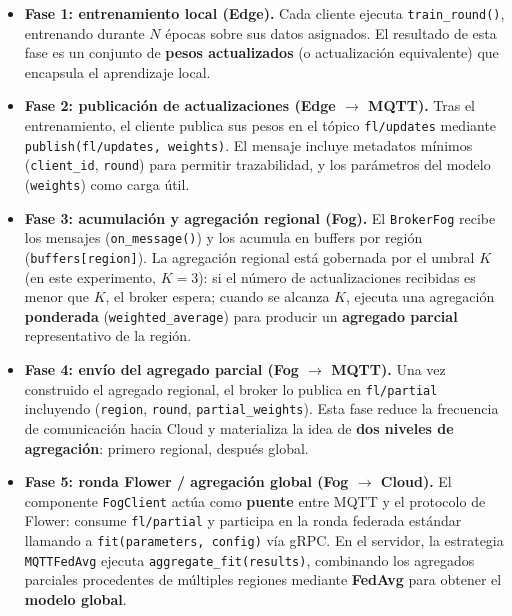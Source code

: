 \documentclass{report}
\begin{document}
\begin{itemize}\setlength\itemsep{0.25em}
    \item \textbf{Fase 1: entrenamiento local (Edge).} Cada cliente ejecuta \texttt{train\_round()}, entrenando durante $N$ épocas sobre sus datos asignados. El resultado de esta fase es un conjunto de \textbf{pesos actualizados} (o actualización equivalente) que encapsula el aprendizaje local.

    \item \textbf{Fase 2: publicación de actualizaciones (Edge $\rightarrow$ MQTT).} Tras el entrenamiento, el cliente publica sus pesos en el tópico \texttt{fl/updates} mediante \texttt{publish(fl/updates, weights)}. El mensaje incluye metadatos mínimos (\texttt{client\_id}, \texttt{round}) para permitir trazabilidad, y los parámetros del modelo (\texttt{weights}) como carga útil.

    \item \textbf{Fase 3: acumulación y agregación regional (Fog).} El \texttt{BrokerFog} recibe los mensajes (\texttt{on\_message()}) y los acumula en buffers por región (\texttt{buffers[region]}). La agregación regional está gobernada por el umbral $K$ (en este experimento, $K=3$): si el número de actualizaciones recibidas es menor que $K$, el broker espera; cuando se alcanza $K$, ejecuta una agregación \textbf{ponderada} (\texttt{weighted\_average}) para producir un \textbf{agregado parcial} representativo de la región.
    
    \item \textbf{Fase 4: envío del agregado parcial (Fog $\rightarrow$ MQTT).} Una vez construido el agregado regional, el broker lo publica en \texttt{fl/partial} incluyendo (\texttt{region}, \texttt{round}, \texttt{partial\_weights}). Esta fase reduce la frecuencia de comunicación hacia Cloud y materializa la idea de \textbf{dos niveles de agregación}: primero regional, después global.

    \item \textbf{Fase 5: ronda Flower / agregación global (Fog $\rightarrow$ Cloud).} El componente \texttt{FogClient} actúa como \textbf{puente} entre MQTT y el protocolo de Flower: consume \texttt{fl/partial} y participa en la ronda federada estándar llamando a \texttt{fit(parameters, config)} vía gRPC. En el servidor, la estrategia \texttt{MQTTFedAvg} ejecuta \texttt{aggregate\_fit(results)}, combinando los agregados parciales procedentes de múltiples regiones mediante \textbf{FedAvg} para obtener el \textbf{modelo global}.


\end{itemize}
\end{document}
